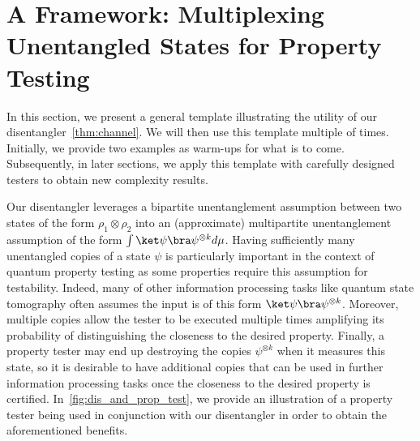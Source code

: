 

\section{A Framework: Multiplexing Unentangled States for Property Testing}\label{sec:prop_testing}

In this section, we present a general template illustrating the utility of our disentangler~\cref{thm:channel}. 
We will then use this template multiple of times. Initially, we provide two examples as warm-ups for what is to come. Subsequently, in later sections, we apply this template with carefully designed testers to obtain new complexity results.

Our disentangler leverages a bipartite unentanglement assumption between two states of the form
$\rho_1 \otimes \rho_2$ into an (approximate) multipartite unentanglement assumption of the form $\int \ket\psi\bra\psi^{\otimes k}d\mu$.
Having sufficiently many unentangled copies of a state $\psi$ is particularly important in the context of quantum property
testing as some properties require this assumption for testability. Indeed, many of other information processing
tasks like quantum state tomography often assumes the input is of this form $\ket \psi\bra\psi^{\otimes k}$. Moreover, multiple copies
allow the tester to be executed multiple times amplifying its probability of distinguishing the closeness to
the desired property. Finally, a property tester may end up destroying the copies $\psi^{\otimes k}$ when it measures this state,
so it is desirable to have additional copies that can be used in further information processing tasks once the closeness to
the desired property is certified. In~\cref{fig:dis_and_prop_test}, we provide an illustration of a property
tester being used in conjunction with our disentangler in order to obtain the aforementioned benefits.

\usetikzlibrary{positioning, decorations.pathreplacing, arrows.meta, calc, fit}

